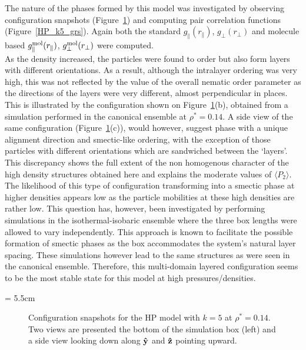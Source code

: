 The nature of the phases formed by this model was investigated by observing configuration
snapshots (\eg Figure~\ref{fig:HP_k5_d0.14_snaps}) and computing  pair correlation
functions (Figure~\ref{HP_k5_grs}). Again both the standard $g_\parallel(r_\parallel)$, 
$g_\perp(r_\perp)$ and  molecule based $g^{\mathrm{mol}}_\parallel(r_\parallel)$, 
$g^{\mathrm{mol}}_\perp(r_\perp)$ were computed.\\
%
As the density increased, the particles were found to order but also form layers with different 
orientations.  As a result, although the intralayer ordering was very high, this was not 
reflected by the value  of the overall nematic order parameter as the directions of the layers 
were very different, almost perpendicular in places. This is illustrated by the configuration shown on  
Figure~\ref{fig:HP_k5_d0.14_snaps}(b), obtained from a simulation performed in the canonical 
ensemble at
$\rho^{*}=0.14$. A side view of the same configuration (Figure~\ref{fig:HP_k5_d0.14_snaps}(c)), 
would however, suggest phase with a unique alignment direction and smectic-like ordering,
with the exception of those particles with different orientations which are sandwiched 
between the `layers'. 
This discrepancy shows the full extent of the non homogenous character of the high density
structures obtained here and explains the moderate values of $\langle P_2 \rangle$.\\
The likelihood of this type of configuration transforming into a smectic phase at higher
densities appears low as the particle mobilities at these high densities are rather low. 
This question has, however, been investigated by performing simulations in the 
isothermal-isobaric ensemble  where the three box lengths were allowed to vary independently.
This approach is known to facilitate the 
possible formation of smectic phases as the box accommodates the system's natural layer spacing. 
These simulations however lead to the same structures as were seen 
in the canonical ensemble.  Therefore, this multi-domain layered configuration seems to be the 
most stable state for this model at high pressures/densities.

\picW = 5.5cm
\begin{figure}
	\centering
	
	\hspace{2cm}
	\caption{Configuration snapshots for the HP model with $k=5$ at $\rho^{*}=0.14$. Two
	views are presented the bottom of the simulation box (left) and a side view looking down
	along $\mathbf{\hat{y} }$ and $\mathbf{\hat{z} }$ pointing upward.}
	\label{fig:HP_k5_d0.14_snaps}
\end{figure}


